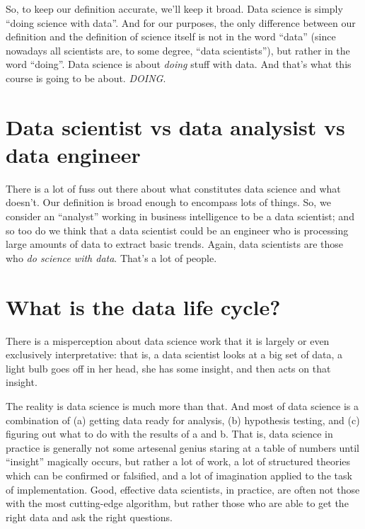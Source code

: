 \documentclass[
]{book}
\begin{document}
So, to keep our definition accurate, we'll keep it broad. Data science is simply ``doing science with data''. And for our purposes, the only difference between our definition and the definition of science itself is not in the word ``data'' (since nowadays all scientists are, to some degree, ``data scientists''), but rather in the word ``doing''. Data science is about \emph{doing} stuff with data. And that's what this course is going to be about. \emph{DOING}.

\hypertarget{data-scientist-vs-data-analysist-vs-data-engineer}{%
\section*{Data scientist vs data analysist vs data engineer}\label{data-scientist-vs-data-analysist-vs-data-engineer}}

There is a lot of fuss out there about what constitutes data science and what doesn't. Our definition is broad enough to encompass lots of things. So, we consider an ``analyst'' working in business intelligence to be a data scientist; and so too do we think that a data scientist could be an engineer who is processing large amounts of data to extract basic trends. Again, data scientists are those who \emph{do science with data}. That's a lot of people.

\hypertarget{what-is-the-data-life-cycle}{%
\section*{What is the data life cycle?}\label{what-is-the-data-life-cycle}}

There is a misperception about data science work that it is largely or even exclusively interpretative: that is, a data scientist looks at a big set of data, a light bulb goes off in her head, she has some insight, and then acts on that insight.

The reality is data science is much more than that. And most of data science is a combination of (a) getting data ready for analysis, (b) hypothesis testing, and (c) figuring out what to do with the results of a and b. That is, data science in practice is generally not some artesenal genius staring at a table of numbers until ``insight'' magically occurs, but rather a lot of work, a lot of structured theories which can be confirmed or falsified, and a lot of imagination applied to the task of implementation. Good, effective data scientists, in practice, are often not those with the most cutting-edge algorithm, but rather those who are able to get the right data and ask the right questions.
\end{document}

